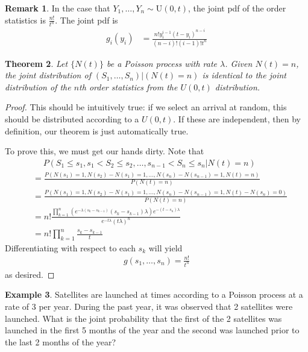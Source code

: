 \documentclass[11pt]{amsart}
\newtheorem{theorem}{Theorem}[section]
\theoremstyle{definition}
\newtheorem{remark}[theorem]{Remark}
\newtheorem{example}[theorem]{Example}
\numberwithin{equation}{section}
\begin{document}
 \begin{remark}
     In the case that $Y_1,\ldots,Y_n\sim\mathrm{U}(0,t)$, the joint pdf of the order statistics is $\frac{n!}{t^n}$. The joint pdf is 
     \begin{align*}
         g_i(y_i)&=\frac{n!y_i^{i-1}(t-y_i)^{n-i}}{(n-i)!(i-1)!t^n}
     \end{align*}
 \end{remark}
 \begin{theorem}
     Let $\{N(t)\}$ be a Poisson process with rate $\lambda$. Given $N(t)=n$, the joint distribution of $(S_1,\ldots,S_n)|(N(t)=n)$ is identical to the joint distribution of the $n$th order statistics from the $U(0,t)$ distribution.
 \end{theorem}
 \begin{proof}
     This should be intuitively true: if we select an arrival at random, this should be distributed according to a $U(0,t)$. If these are independent, then by definition, our theorem is just automatically true.

     To prove this, we must get our hands dirty. Note that
     \begin{align*}
         &\hspace{15pt}P(S_1\le s_1,s_1<S_2\le s_2,\ldots,s_{n-1}<S_n\le s_n|N(t)=n)\\
         &=\frac{P(N(s_1)=1,N(s_2)-N(s_1)=1,\ldots,N(s_n)-N(s_{n-1})=1,N(t)=n)}{P(N(t)=n)}\\
         &=\frac{P(N(s_1)=1,N(s_2)-N(s_1)=1,\ldots,N(s_n)-N(s_{n-1})=1,N(t)-N(s_n)=0)}{P(N(t)=n)}\\
         &=n!\frac{\prod_{k=1}^n\left(e^{-\lambda(s_k-s_{k-1})}(s_k-s_{k-1})\lambda\right)e^{-(t-s_n)\lambda}}{e^{-t\lambda}(t\lambda)^n}\\
         &=n!\prod_{k=1}^n\frac{s_k-s_{k-1}}{t}
     \end{align*}
     Differentiating with respect to each $s_k$ will yield
     \begin{align*}
         g(s_1,\ldots,s_n)=\frac{n!}{t^n}
     \end{align*}
     as desired.
 \end{proof}
 \begin{example}
     Satellites are launched at times according to a Poisson process at a rate of 3 per year. During the past year, it was observed that 2 satellites were launched. What is the joint probability that the first of the 2 satellites was launched in the first 5 months of the year and the second was launched prior to the last 2 months of the year?
 \end{example}
\end{document}
